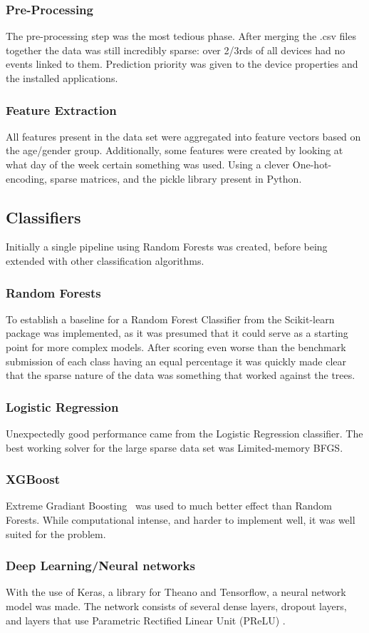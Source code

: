 \documentclass[runningheads,a4paper]{llncs}
\begin{document}
\subsubsection{Pre-Processing}
The pre-processing step was the most tedious phase. After merging the .csv files together the data was still incredibly sparse: over 2/3rds of all devices had no events linked to them. Prediction priority was given to the device properties and the installed applications.
\subsubsection{Feature Extraction}
All features present in the data set were aggregated into feature vectors based on the age/gender group. Additionally, some features were created by looking at what day of the week certain something was used. Using a clever One-hot-encoding, sparse matrices, and the pickle library present in Python. 
\subsection{Classifiers}
Initially a single pipeline using Random Forests was created, before being extended with other classification algorithms. 
\subsubsection{Random Forests}
To establish a baseline for a Random Forest Classifier from the Scikit-learn package was implemented, as it was presumed that it could serve as a starting point for more complex models. After scoring even worse than the benchmark submission of each class having an equal percentage it was quickly made clear that the sparse nature of the data was something that worked against the trees.
\subsubsection{Logistic Regression}
Unexpectedly good performance came from the Logistic Regression classifier. The best working solver for the large sparse data set was Limited-memory BFGS. 
\subsubsection{XGBoost}
Extreme Gradiant Boosting~\cite{CT2015} was used to much better effect than Random Forests. While computational intense, and harder to implement well, it was well suited for the problem. \medskip
\subsubsection{Deep Learning/Neural networks}
With the use of Keras, a library for Theano and Tensorflow, a neural network model was made. The network consists of several dense layers, dropout layers, and layers that use Parametric Rectified Linear Unit (PReLU) \cite{PReLU}. 
\end{document}
